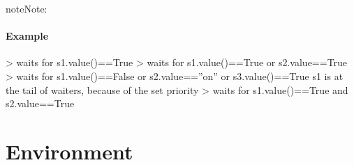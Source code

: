 \documentclass[letterpaper,10pt,english]{sphinxmanual}
\begin{document}
\begin{fulllineitems}
\begin{fulllineitems}
\begin{sphinxadmonition}{note}{Note:}
\begin{itemize}
\end{itemize}
\end{sphinxadmonition}
\paragraph{Example}

\textendash{}\textgreater{} waits for s1.value()==True 
\textendash{}\textgreater{} waits for s1.value()==True or s2.value==True 
\textendash{}\textgreater{} waits for s1.value()==False or s2.value==”on” or s3.value()==True 
s1 is at the tail of waiters, because of the set priority 
\textendash{}\textgreater{} waits for s1.value()==True and s2.value==True 

\end{fulllineitems}


\end{fulllineitems}



\section{Environment}
\label{\detokenize{Reference:environment}}
\end{document}
